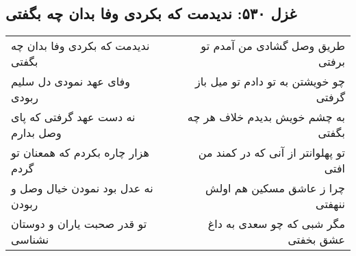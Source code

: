 \begin{center}
\section*{غزل ۵۳۰: ندیدمت که بکردی وفا بدان چه بگفتی}
\label{sec:530}
\begin{longtable}{l p{0.5cm} r}
ندیدمت که بکردی وفا بدان چه بگفتی
&&
طریق وصل گشادی من آمدم تو برفتی
\\
وفای عهد نمودی دل سلیم ربودی
&&
چو خویشتن به تو دادم تو میل باز گرفتی
\\
نه دست عهد گرفتی که پای وصل بدارم
&&
به چشم خویش بدیدم خلاف هر چه بگفتی
\\
هزار چاره بکردم که همعنان تو گردم
&&
تو پهلوانتر از آنی که در کمند من افتی
\\
نه عدل بود نمودن خیال وصل و ربودن
&&
چرا ز عاشق مسکین هم اولش ننهفتی
\\
تو قدر صحبت یاران و دوستان نشناسی
&&
مگر شبی که چو سعدی به داغ عشق بخفتی
\\
\end{longtable}
\end{center}
